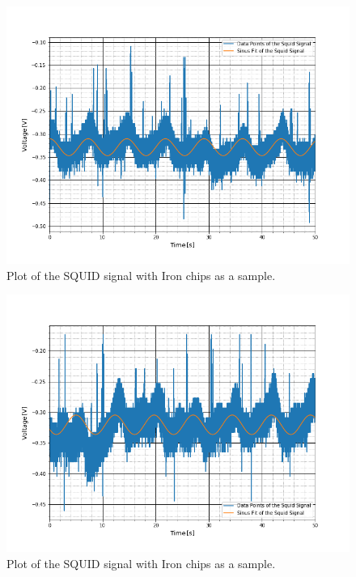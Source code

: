 \begin{figure}[ht]
	\includegraphics[scale=0.5]{Bild/P1_3}
	\centering
	\caption[SQUID signal of Iron Chips 3]{Plot of the SQUID signal with Iron chips as a sample.}
\end{figure}
\begin{figure}[ht]
	\includegraphics[scale=0.5]{Bild/P1_4}
	\centering
	\caption[SQUID signal of Iron Chips 4]{Plot of the SQUID signal with Iron chips as a sample.}
\end{figure}
